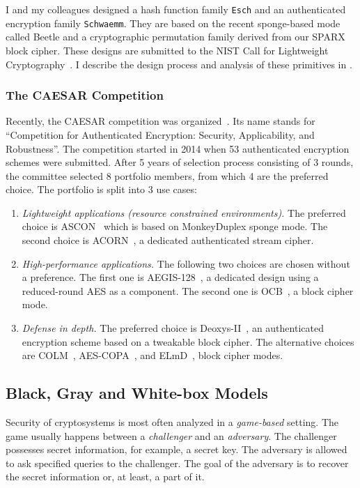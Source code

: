 I and my colleagues designed a hash function family \texttt{Esch} and an authenticated encryption family \texttt{Schwaemm}. They are based on the recent sponge-based mode called Beetle and a cryptographic permutation family derived from our SPARX block cipher. These designs are submitted to the NIST Call for Lightweight Cryptography~\cite{NISTlight}. I describe the design process and analysis of these primitives in .


\subsubsection{The CAESAR Competition}
Recently, the CAESAR competition was organized~\cite{CAESAR}. Its name stands for ``Competition for Authenticated Encryption: Security, Applicability, and Robustness''. The competition started in 2014 when 53 authenticated encryption schemes were submitted. After 5 years of selection process consisting of 3 rounds, the committee selected 8 portfolio members, from which 4 are the preferred choice. The portfolio is split into 3 use cases:

\begin{enumerate}
    \item \emph{Lightweight applications (resource constrained environments).}
    The preferred choice is ASCON~\cite{ASCON} which is based on MonkeyDuplex sponge mode. The second choice is ACORN~\cite{ACORN}, a dedicated authenticated stream cipher.
    
    \item \emph{High-performance applications.}
    The following two choices are chosen without a preference. The first one is AEGIS-128~\cite{AEGIS}, a dedicated design using a reduced-round AES as a component. The second one is OCB~\cite{OCBcaesar}, a block cipher mode.
    
    \item \emph{Defense in depth.}
    The preferred choice is Deoxys-II~\cite{DEOXYS}, an authenticated encryption scheme based on a tweakable block cipher. The alternative choices are COLM~\cite{COLM}, AES-COPA~\cite{COPA}, and ELmD~\cite{ELMD}, block cipher modes.
\end{enumerate}


\subsection{Black, Gray and White-box Models}

Security of cryptosystems is most often analyzed in a \emph{game-based} setting. The game usually happens between a \emph{challenger} and an \emph{adversary}. The challenger possesses secret information, for example, a secret key. The adversary is allowed to ask specified queries to the challenger. The goal of the adversary is to recover the secret information or, at least, a part of it.

